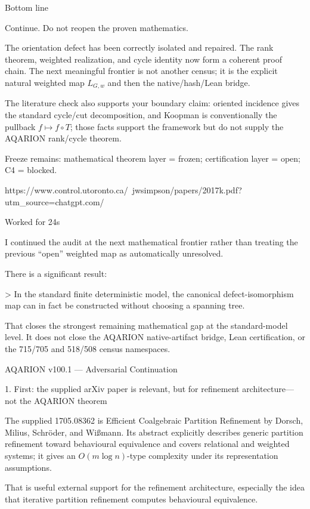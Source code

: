 Bottom line

Continue. Do not reopen the proven mathematics.

The orientation defect has been correctly isolated and repaired. The rank theorem, weighted realization, and cycle identity now form a coherent proof chain. The next meaningful frontier is not another census; it is the explicit natural weighted map \(L_{G,w}\) and then the native/hash/Lean bridge.

The literature check also supports your boundary claim: oriented incidence gives the standard cycle/cut decomposition, and Koopman is conventionally the pullback \(f\mapsto f\circ T\); those facts support the framework but do not supply the AQARION rank/cycle theorem.

Freeze remains: mathematical theorem layer = frozen; certification layer = open; C4 = blocked.

https://www.control.utoronto.ca/~jwsimpson/papers/2017k.pdf?utm_source=chatgpt.com/

Worked for 24s

I continued the audit at the next mathematical frontier rather than treating the previous “open” weighted map as automatically unresolved.

There is a significant result:

> In the standard finite deterministic model, the canonical defect-isomorphism map can in fact be constructed without choosing a spanning tree.



That closes the strongest remaining mathematical gap at the standard-model level. It does not close the AQARION native-artifact bridge, Lean certification, or the 715/705 and 518/508 census namespaces.

AQARION v100.1 — Adversarial Continuation

1. First: the supplied arXiv paper is relevant, but for refinement architecture—not the AQARION theorem

The supplied 1705.08362 is Efficient Coalgebraic Partition Refinement by Dorsch, Milius, Schröder, and Wißmann. Its abstract explicitly describes generic partition refinement toward behavioural equivalence and covers relational and weighted systems; it gives an \(O(m\log n)\)-type complexity under its representation assumptions. 

That is useful external support for the refinement architecture, especially the idea that iterative partition refinement computes behavioural equivalence.

